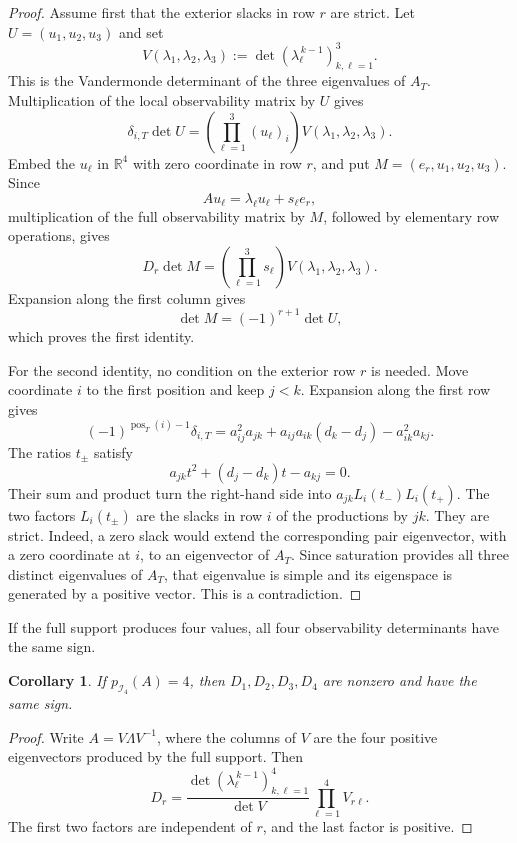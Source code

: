 \documentclass[11pt,a4paper]{article}
\newtheorem{corollary}[theorem]{Corollary}
\theoremstyle{definition}
\newcommand{\R}{\mathbb R}
\newcommand{\Ind}{\mathcal I}
\begin{document}
\begin{proof}
Assume first that the exterior slacks in row $r$ are strict.
Let $U=(u_1,u_2,u_3)$ and set
$$
V(\lambda_1,\lambda_2,\lambda_3)
:=
\det(\lambda_\ell^{\,k-1})_{k,\ell=1}^3.
$$
This is the Vandermonde determinant of the three eigenvalues of $A_T$.
Multiplication of the local observability matrix by $U$ gives
$$
\delta_{i,T}\det U
=
\left(\prod_{\ell=1}^3(u_\ell)_i\right)
V(\lambda_1,\lambda_2,\lambda_3).
$$
Embed the $u_\ell$ in $\R^4$ with zero coordinate in row $r$, and put
$M=(e_r,u_1,u_2,u_3)$. Since
$$
Au_\ell=\lambda_\ell u_\ell+s_\ell e_r,
$$
multiplication of the full observability matrix by $M$, followed by
elementary row operations, gives
$$
D_r\det M
=
\left(\prod_{\ell=1}^3s_\ell\right)
V(\lambda_1,\lambda_2,\lambda_3).
$$
Expansion along the first column gives
$$
\det M=(-1)^{r+1}\det U,
$$
which proves the first identity.

For the second identity, no condition on the exterior row $r$ is
needed. Move coordinate $i$ to the first position and keep $j<k$.
Expansion along the first row gives
$$
(-1)^{\operatorname{pos}_T(i)-1}\delta_{i,T}
=
a_{ij}^2a_{jk}
+a_{ij}a_{ik}(d_k-d_j)
-a_{ik}^2a_{kj}.
$$
The ratios $t_\pm$ satisfy
$$
a_{jk}t^2+(d_j-d_k)t-a_{kj}=0.
$$
Their sum and product turn the right-hand side into
$a_{jk}L_i(t_-)L_i(t_+)$. The two factors $L_i(t_\pm)$ are the
slacks in row $i$ of the productions by $jk$. They are strict. Indeed,
a zero slack would extend the corresponding pair eigenvector, with a
zero coordinate at $i$, to an eigenvector of $A_T$. Since saturation
provides all three distinct eigenvalues of $A_T$, that eigenvalue is
simple and its eigenspace is generated by a positive vector. This is a
contradiction.
\end{proof}

If the full support produces four values, all four observability
determinants have the same sign.

\begin{corollary}
\label{cor:common-D-sign}
If $p_{\Ind_4}(A)=4$, then $D_1,D_2,D_3,D_4$ are nonzero and have the
same sign.
\end{corollary}

\begin{proof}
Write $A=V\Lambda V^{-1}$, where the columns of $V$ are the four
positive eigenvectors produced by the full support. Then
$$
D_r
=
\frac{\det(\lambda_\ell^{\,k-1})_{k,\ell=1}^4}
{\det V}
\prod_{\ell=1}^4V_{r\ell}.
$$
The first two factors are independent of $r$, and the last factor is
positive.
\end{proof}
\end{document}
